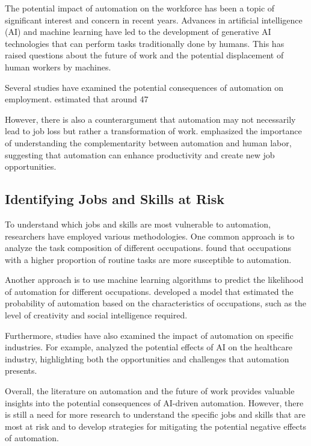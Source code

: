 \documentclass{article}
\begin{document}
The potential impact of automation on the workforce has been a topic of significant interest and concern in recent years. Advances in artificial intelligence (AI) and machine learning have led to the development of generative AI technologies that can perform tasks traditionally done by humans. This has raised questions about the future of work and the potential displacement of human workers by machines.

Several studies have examined the potential consequences of automation on employment. \cite{frey2017future} estimated that around 47%

However, there is also a counterargument that automation may not necessarily lead to job loss but rather a transformation of work. \cite{autor2019work} emphasized the importance of understanding the complementarity between automation and human labor, suggesting that automation can enhance productivity and create new job opportunities.

\subsection{Identifying Jobs and Skills at Risk}

To understand which jobs and skills are most vulnerable to automation, researchers have employed various methodologies. One common approach is to analyze the task composition of different occupations. \cite{bessen2019ai} found that occupations with a higher proportion of routine tasks are more susceptible to automation.

Another approach is to use machine learning algorithms to predict the likelihood of automation for different occupations. \cite{frey2013future} developed a model that estimated the probability of automation based on the characteristics of occupations, such as the level of creativity and social intelligence required.

Furthermore, studies have also examined the impact of automation on specific industries. For example, \cite{brynjolfsson2017artificial} analyzed the potential effects of AI on the healthcare industry, highlighting both the opportunities and challenges that automation presents.

Overall, the literature on automation and the future of work provides valuable insights into the potential consequences of AI-driven automation. However, there is still a need for more research to understand the specific jobs and skills that are most at risk and to develop strategies for mitigating the potential negative effects of automation.
\end{document}
